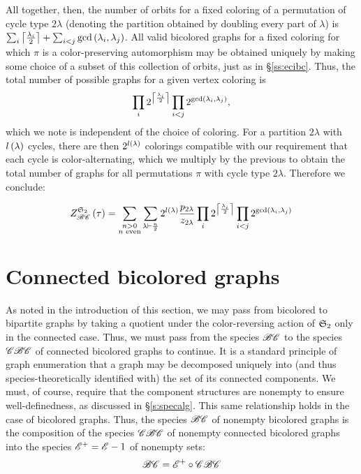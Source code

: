\documentclass[sectionflow,singlespace,twoside,boldmathhdr,draft]{brandiss} %
\numberwithin{section}{chapter}
\numberwithin{figure}{chapter}
\begin{document}
All together, then, the number of orbits for a fixed coloring of a permutation of cycle type $2 \lambda$ (denoting the partition obtained by doubling every part of $\lambda$) is $\sum_{i} \left\lceil {\frac{\lambda_{i}}{2}} \right\rceil + \sum_{i < j} \gcd \left( {\lambda_{i}, \lambda_{j}} \right)$.
All valid bicolored graphs for a fixed coloring for which $\pi$ is a color-preserving automorphism may be obtained uniquely by making some choice of a subset of this collection of orbits, just as in \S \ref{ss:ecibc}.
Thus, the total number of possible graphs for a given vertex coloring is
\begin{equation*}
  \prod_{i} 2^{\left\lceil {\frac{\lambda_{i}}{2}} \right\rceil} \prod_{i < j} 2^{\gcd \left( {\lambda_{i}, \lambda_{j}} \right)},
\end{equation*}
which we note is independent of the choice of coloring.
For a partition $2\lambda$ with $l \left( {\lambda} \right)$ cycles, there are then $2^{l \left( {\lambda} \right)}$ colorings compatible with our requirement that each cycle is color-alternating, which we multiply by the previous to obtain the total number of graphs for all permutations $\pi$ with cycle type $2 \lambda$.
Therefore we conclude:
\begin{theorem}
  \begin{equation}
    \label{eq:tcibc}
    \gci{\symgp{2}}{\specname{BC}} \pbrac{\tau} = \sum_{\substack{n > 0 \\ \text{$n$ even}}} \sum_{\lambda \vdash \frac{n}{2}} 2^{l \pbrac{\lambda}} \frac{p_{2 \lambda}}{z_{2 \lambda}} \prod_{i} 2^{\ceil{\frac{\lambda_{i}}{2}}} \prod_{i < j} 2^{\gcd \pbrac{\lambda_{i}, \lambda_{j}}}
  \end{equation}
\end{theorem}

\section{Connected bicolored graphs}\label{s:cbc}
As noted in the introduction of this section, we may pass from bicolored to bipartite graphs by taking a quotient under the color-reversing action of $ \mathfrak{S}_{2} $ only in the connected case.
Thus, we must pass from the species $\mathscr{BC}$ to the species $\mathscr{CBC}$ of connected bicolored graphs to continue.
It is a standard principle of graph enumeration that a graph may be decomposed uniquely into (and thus species-theoretically identified with) the set of its connected components.
We must, of course, require that the component structures are nonempty to ensure well-definedness, as discussed in \S \ref{s:specalg}.
This same relationship holds in the case of bicolored graphs.
Thus, the species $\mathscr{BC}$ of nonempty bicolored graphs is the composition of the species $\mathscr{CBC}$ of nonempty connected bicolored graphs into the species $\mathscr{E}^{+} = \mathscr{E} - 1$ of nonempty sets:
\begin{equation} \mathscr{BC} = \mathscr{E}^{+} \circ \mathscr{CBC} \label{eq:bcdecomp} \end{equation}
\end{document}
